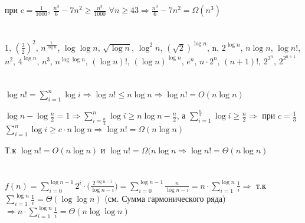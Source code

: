 \documentclass{article}
\begin{document}
\begin{flushleft}
\section{}

при $ c = \frac{1}{1000}$,  
$\frac{n^3}{6} - 7n^2 \ge \frac{n^3}{1000}$ $\forall n \ge 43 \Rightarrow \frac{n^3}{6} - 7n^2 = \Omega(n^3)$

\section{}

1, $(\frac{3}{2})^2$,  $n^{\frac{1}{\log{n}}}$, $\log{\log{n}}$, $\sqrt{\log{n}}$, ${\log^2{n}}$, $(\sqrt{2})^{\log{n}}$, n, $2^{\log{n}}$, $n\log{n}$, $\log{n!}$, $n^2$, $4^{\log{n}}$, $n^3$, $n^{\log{\log{n}}}$, $(\log{n})!$, $(\log{n})^{\log{n}}$, $e^n$, $n \cdot 2^n$, $(n + 1)!$, $2^{2^n}$, $2^{2^{n + 1}}$

\section{}

$\log{n!} = \sum\limits_{i = 1}^n{\log{i}} \Rightarrow \log{n!} \le n \log{n} \Rightarrow \log{n!} = O(n \log{n})$	

$\log{n} - \log{\frac{n}{2}} = 1 \Rightarrow \sum\limits_{i = \frac{n}{2}}^n \log{i} \ge n \log{n} - \frac{n}{2}$, а $\sum\limits_{i = 1}^\frac{n}{2}\log{i} \ge \frac{n}{2} \Rightarrow$ при $c = \frac{1}{3}$ $\sum\limits_{i = 1}^n{\log{i}} \ge c \cdot n \log{n}\Rightarrow \log{n!} =  \Omega(n \log{n})$

Т.к $\log{n!} = O(n \log{n})$ и $\log{n!} = \Omega(n \log{n} \Rightarrow \log{n!} = \Theta(n \log{n})$

\section{}

$f(n) = \sum\limits_{i = 0}^{\log{n} - 1}{2^i \cdot (\frac{2^{\log{n} - i}}{\log{n} - i}}) = \sum\limits_{i = 0}^{\log{n} - 1}{\frac{n}{\log{n} - i}} = n \cdot \sum\limits_{i = 1}^{\log{n}}{\frac{1}{i}} \Rightarrow$ т.к $\sum\limits_{i = 1}^{\log{n}}{\frac{1}{i}} = \Theta(\log\log{n})$ (см. Сумма гармонического ряда) $\Rightarrow n \cdot \sum\limits_{i = 1}^{\log{n}}{\frac{1}{i}} = \Theta(n \log\log{n})$ 
\section{}


\end{flushleft}
\end{document}
